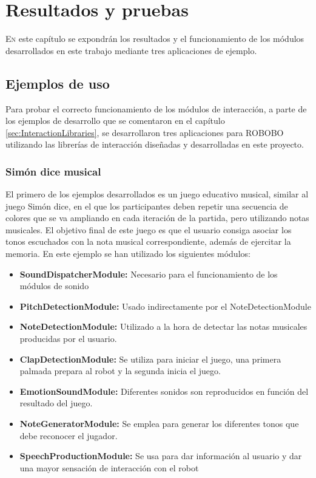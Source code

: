 \chapter{Resultados y pruebas}
\label{chap:results}
\vspace{0.5cm}


 
\lettrine{E}{n} este capítulo se expondrán los resultados y el funcionamiento de los módulos desarrollados en este trabajo mediante tres aplicaciones de ejemplo.
\section{Ejemplos de uso}
Para probar el correcto funcionamiento de los módulos de interacción, a parte de los ejemplos de desarrollo que se comentaron en el capítulo \ref{sec:InteractionLibraries}, se desarrollaron tres aplicaciones para ROBOBO utilizando las librerías de interacción diseñadas y desarrolladas en este proyecto.

\subsection{Simón dice musical}
\label{subsec:simon-musical}
El primero de los ejemplos desarrollados es un juego educativo musical, similar al juego Simón dice, en el que los participantes deben repetir una secuencia de colores que se va ampliando en cada iteración de la partida, pero utilizando notas musicales. El objetivo final de este juego es que el usuario consiga asociar los tonos escuchados con la nota musical correspondiente, además de ejercitar la memoria.
En este ejemplo se han utilizado los siguientes módulos:

\begin{itemize}
	\item \textbf{SoundDispatcherModule:} Necesario para el funcionamiento de los módulos de sonido
	\item \textbf{PitchDetectionModule:} Usado indirectamente por el NoteDetectionModule
	\item \textbf{NoteDetectionModule:} Utilizado a la hora de detectar las notas musicales producidas por el usuario.
	\item \textbf{ClapDetectionModule:} Se utiliza para iniciar el juego, una primera palmada prepara al robot y la segunda inicia el juego.
	\item \textbf{EmotionSoundModule:} Diferentes sonidos son reproducidos en función del resultado del juego.
	\item \textbf{NoteGeneratorModule:} Se emplea para generar los diferentes tonos que debe reconocer el jugador.
	\item \textbf{SpeechProductionModule:} Se usa para dar información al usuario y dar una mayor sensación de interacción con el robot
\end{itemize}

